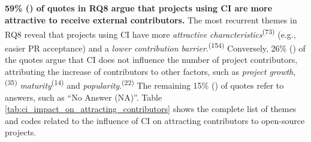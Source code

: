 \subsection*{\textbf{\RQeight}}
	
	\noindent\textbf{59\% () of quotes in RQ8 argue that projects using CI are more attractive to receive external contributors.} The most recurrent themes in RQ8 reveal that projects using CI have more  \textit{attractive characteristics}\textsuperscript{(73)} (e.g., easier PR acceptance) and a \textit{lower contribution barrier}.\textsuperscript{(154)}
	Conversely, 26\% () of the quotes argue that CI does not influence the number of project contributors, attributing the increase of contributors to other factors, such as \textit{project growth},\textsuperscript{(35)} \textit{maturity}\textsuperscript{(14)} and \textit{popularity}.\textsuperscript{(22)} The remaining 15\% () of quotes refer to answers, such as ``No Answer (NA)''. Table \ref{tab:ci_impact_on_attracting_contributors} shows the complete list of themes and codes related to the influence of CI on attracting contributors to open-source projects.
	
